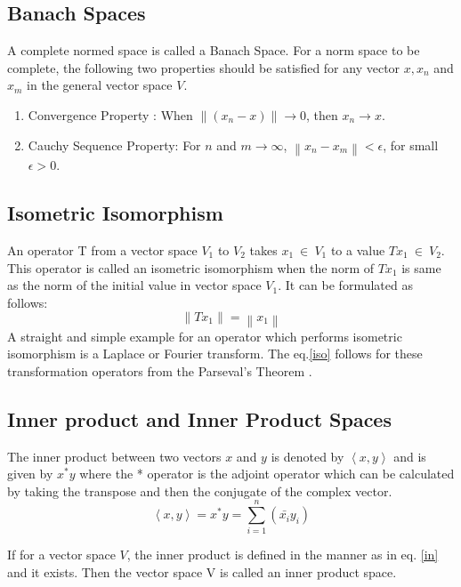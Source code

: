 \documentclass[a4paper,12pt]{article}
\newcommand\norm[1]{\left\lVert#1\right\rVert}
\begin{document}
	\subsection{Banach Spaces}
	A complete normed space is called a Banach Space. For a norm space to be complete, the following two properties should be satisfied for any vector $x, x_{n}$ and $x_{m}$ in the general vector space $V$.
		\begin{enumerate}
			\item Convergence Property : When $\norm{(x_{n} -x)}\rightarrow 0$, then $x_{n} \rightarrow x$.
			\item Cauchy Sequence Property: For $n$ and $m \rightarrow \infty$, $\norm{x_{n}-x_{m}} < \epsilon$, for small $\epsilon > 0$. 		\end{enumerate}
	
	\subsection{Isometric Isomorphism}
	An operator T from a vector space $V_{1}$ to $V_{2}$ takes $x_{1} \:\in\: V_{1}$ to a value $Tx_{1} \:\in \:V_{2}$. This operator is called an isometric isomorphism when the norm of $Tx_{1}$ is same as the norm of the initial value in vector space $V_{1}$. It can be formulated as follows:
		\begin{equation}
			\norm{Tx_{1}} = \norm{x_{1}}
			\label{iso}
		\end{equation}
	A straight and simple example for an operator which performs isometric isomorphism is a Laplace or Fourier transform. The eq.\ref{iso} follows for these transformation operators from the Parseval's Theorem \cite{parseval}.
	\subsection{Inner product and Inner Product Spaces} The inner product between two vectors $x$ and $y$ is denoted by $\left\langle x, y \right\rangle$ and is given by $x^{*}y$ where the * operator is the adjoint operator which can be calculated by taking the transpose and then the conjugate of the complex vector.
		\begin{equation}
			\left\langle x, y \right\rangle = x^{*}y = \sum\limits_{i=1}^n (\bar{x_{i}}y_{i})
			\label{in}
		\end{equation}
		
		If for a vector space $V$, the inner product is defined in the manner as in eq. \ref{in} and it exists. Then the vector space V is called an inner product space.
\end{document}
